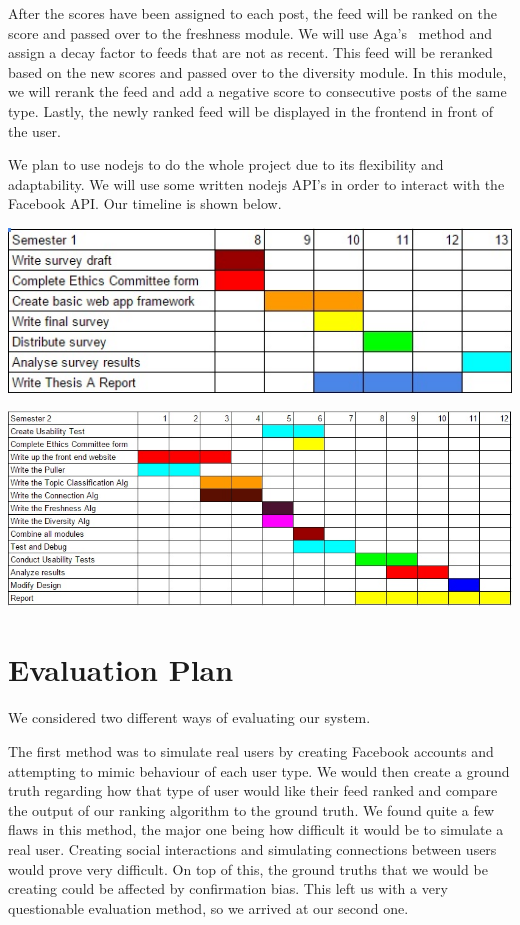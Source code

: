 After the scores have been assigned to each post,  the feed will be ranked on the score and passed over to the freshness module. We will use Aga's~\cite{Aga2014} method and assign a decay factor to feeds that are not as recent. This feed will be reranked based on the new scores and passed over to the diversity module. In this module, we will rerank the feed and add a negative score to consecutive posts of the same type. Lastly, the newly ranked feed will be displayed in the frontend in front of the user.

We plan to use nodejs to do the whole project due to its flexibility and adaptability. We will use some written nodejs API's in order to interact with the Facebook API. 
Our timeline is shown below.

\begin{center}
  \includegraphics[scale=0.8]{images/sem1thesis.jpg}
\end{center}

\begin{center}
  \includegraphics[scale=0.8]{images/sem2thesis.jpg}
\end{center}
\section {Evaluation Plan}

We considered two different ways of evaluating our system.

The first method was to simulate real users by creating Facebook accounts and attempting to mimic behaviour of each user type. We would then create a ground truth regarding how that type of user would like their feed ranked and compare the output of our ranking algorithm to the ground truth. We found quite a few flaws in this method, the major one being how difficult it would be to simulate a real user. Creating social interactions and simulating connections between users would prove very difficult. On top of this, the ground truths that we would be creating could be affected by confirmation bias. This left us with a very questionable evaluation method, so we arrived at our second one.


